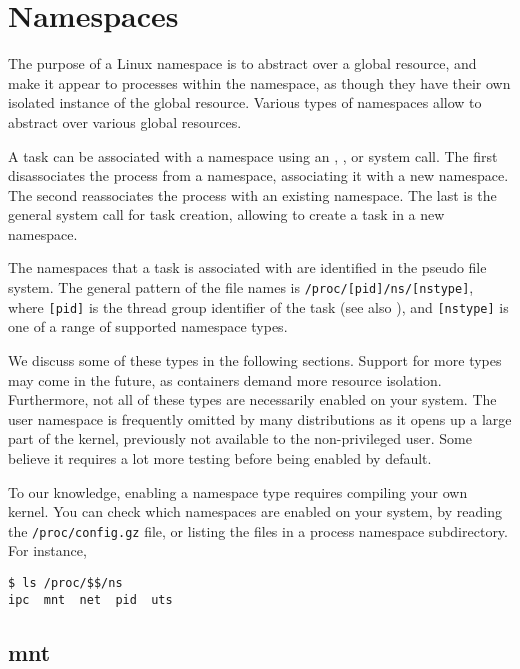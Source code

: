 
\section{Namespaces}

The purpose of a Linux namespace is to abstract over a global resource, and
make it appear to processes within the namespace, as though they have their own
isolated instance of the global resource. Various types of namespaces allow to
abstract over various global resources.

A task can be associated with a namespace using an \cite{man-2-unshare},
\cite{man-2-setns}, or \cite{man-2-clone} system call. The first disassociates
the process from a namespace, associating it with a new namespace. The second
reassociates the process with an existing namespace. The last is the general
system call for task creation, allowing to create a task in a new namespace.

The namespaces that a task is associated with are identified in the
\cite{man-5-proc} pseudo file system. The general pattern of the file names is
\texttt{/proc/[pid]/ns/[nstype]}, where \texttt{[pid]} is the thread group
identifier of the task (see also
), and \texttt{[nstype]} is one
of a range of supported namespace types.

We discuss some of these types in the following sections. Support for more
types may come in the future, as containers demand more resource isolation.
Furthermore, not all of these types are necessarily enabled on your system. The
user namespace is frequently omitted by many distributions as it opens up a
large part of the kernel, previously not available to the non-privileged user.
Some believe it requires a lot more testing before being enabled by default.

To our knowledge, enabling a namespace type requires compiling your own kernel.
You can check which namespaces are enabled on your system, by reading the
\texttt{/proc/config.gz} file, or listing the files in a process namespace
subdirectory. For instance,

\begin{lstlisting}
$ ls /proc/$$/ns
ipc  mnt  net  pid  uts
\end{lstlisting}

\subsection{mnt}


